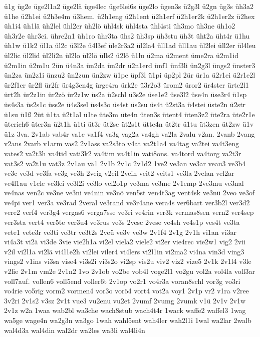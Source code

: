 {ü1g
üg2e
üge2l1a2
üge2lä
üge4lec
üge6lei6s
üge2lo
ügen3s
ü2g3l
ü2gn
üg3s
üh3a2
ü1he
ü2h1ei
ü2h3e4m
ü3hem.
ü2h1eng
ü2h1ent
ü2h1erf
ü2h1er2k
ü2h1er2z
ü2hex
üh1i4
üh1lä
üh2lel
ühl2er
üh2lö
ühl4sk
ühl4sta
ühl4sti
üh3mo
üh3ne
üh1o2
üh3r2e
ühr3ei.
ühre2n1
üh1ro
ühr3ta
ühs2
üh3sp
üh3stu
üh3t
üht2a
üht4r
ü1hu
üh1w
ü1k2
ül1a
ül2c
ü3l2e
ü4l3ef
üle2r3a2
ül2la4
üll1ad
üll1au
ül2lei
üll2er
ül4leu
ül2lic
ül2lid
ül2li2n
ül2lo
ül2lö
ülls2
ü2lö
ü1lu
ü2ma
ü2ment
üme2ra
ü2m1id
ü2m1in
ü2m1u
2ün
ü4n3a
ün2da
ün2dr
ü2n1erd
ünf1
ünf3li
ün2g3l
üngs2
ünster3
ün2za
ün2z1i
ünzu2
ün2zun
ün2zw
ü1pe
üpf3l
ü1pi
üp2pl
2ür
ür1a
ü2r1ei
ü2r1e2l
ür2f1er
ür2fl
ür2fr
ür4g3en4g
ürge4ra
ürk2e
ü3r2o3
ürom2
üror2
ür4ster
ürte2l1
ürt2h
ür2z1in
ür2zö
ür2z1w
üs2a
ü2schl
ü3s2e
üse1e2
üse3l2
üse4n
üse3r4
ü1sp
üs4s3a
üs2s1c
üss2e
ü4s3sel
üs4s3o
üs4st
üs2su
üs4t
ü2st3a
ü4stei
üste2n
ü2str
ü1su
ü1ß
2üt
ü1ta
ü2t1al
ü1te
üte3m
üte4n
üten3s
ütent4
üten3z2
üte2ra
üte2r1e
üterich6
üter3n
ü2t1h
ü1ti
üt3r
üt2se
üt2s1t
ütte4n
üt2tr
ü1tu
üt3zen
üt2zw
ü1v
ü1z
3va.
2v1ab
vab4r
va1c
va1f4
va3g
vag2a
va4gh
va2la
2valu
v2an.
2vanb
2vang
v2ans
2varb
v1arm
vas2
2v1ass
va2s3to
v4at
va2t1a4
va4tag
va2tei
va4t3eng
vates2
va2t3h
va4tid
vati3k2
va4tim
va4t1in
vati8ons.
va4tord
va4torg
va2t3r
vat3s2
va2t1u
vat3z
2v1au
vä1
2v1b
2v1c
2v1d2
1ve2
ve3an
ve3ar
veau3
ve3b4
ve3c
ve3d
ve3fa
ve3g
ve3h
2veig
v2eil
2vein
veit2
veits1
ve3la
2velan
vel2ar
ve4l1au
v1ele
ve3lei
ve3l2i
ve3lo
vel2o1p
ve3ma
ve3me
2v1emp
2ve3mu
ve3nal
ve4nas
ven2c
ve3ne
ve3ni
ve4nin
ve3nö
ven5st
ven4t3ag
vent4sk
ve3nü
2veo
ve3of
ve4pi
ver1
ver3a
ve3rad
2veral
ve3rand
ve3r4ane
vera4s
ver6bart
ver3b2l
ver3d2
vere2
verf4
ver3g4
vergas6
verga7sse
ve3ri
ve4rin
ver3k
vermas8sen
vern2
ver4sep
ver3sta
vert4
ver5te
ver3u4
ve3rus
ve3s
2vesc
2vese
ve4sh
ve4s1p
ves4t
ve3ta
vete1
vete3r
ve3ti
ve3tr
ve3t2s
2veü
ve3v
ve3w
2v1f4
2v1g
2v1h
vi1an
vi3ar
vi4a3t
vi2ä
vi3de
3vie
vie2h1a
vi2el
viela2
viele2
vi2er
vie4rec
vie2w1
vig2
2vii
v2il
vi2l1a
vi2lä
vi4l1e2h
vi2lei
viler4
vi4lers
vi2l1in
vi2ma2
vi4na
vin3d
ving3
vings2
v1ins
vi3sa
vise4
vi3s2i
vi3s2o
vi2sp
vis2u
viv2
viz2
vize5
2v1k
2v1l4
v3le
v2lie
2v1m
vm2e
2v1n2
1vo
2v1ob
vo2be
vob4l
voge2l1
vo2gu
vol2a
vol4la
voll3ar
voll7auf.
vollen6
voll5end
voller6t
2v1op
vo2r1
vo4r3a
voran8schl
vor3g
vo3ri
vo4rie
vo5rig
vorm2
vormen4
vor3o
vorö4
vort4
vot2a
voy1
2v1p
vr2
v1ra
v2ree
3v2ri
2v1s2
v3sz
2v1t
vue3
vu2enu
vu2et
2vumf
2vumg
2vumk
v1ü
2v1v
2v1w
2v1z
w2a
1waa
wab2bl
wa3che
wach8stub
wach4t4r
1wack
waffe2
waffel3
1wag
wa5ge
wage4n
wa2g3n
wa3go
1wah
wahl5ent
wah4ler
wah2l1i
1wal
wa2lar
2walb
wal4d3a
wal4din
wal2dr
wa2les
wa3li
wal4li4n
}

